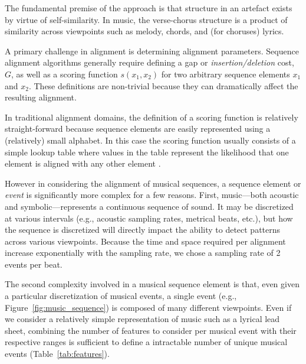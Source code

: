 \documentclass[phd,electronic,oneside,twosidetoc,letterpaper,chaptercenter,parttop,lol,lof,lot]{byumsphd}
\begin{document}
The fundamental premise of the approach is that structure in an artefact exists by virtue of self-similarity. In music, the verse-chorus structure is a product of similarity across viewpoints such as melody, chords, and (for choruses) lyrics.

A primary challenge in alignment is determining alignment parameters. Sequence alignment algorithms generally require defining a gap or \textit{insertion/deletion} cost, $G$, as well as a scoring function $s(x_1,x_2)$ for two arbitrary sequence elements $x_1$ and $x_2$. These definitions are non-trivial because they can dramatically affect the resulting alignment.

In traditional alignment domains, the definition of a scoring function is relatively straight-forward because sequence elements are easily represented using a (relatively) small alphabet. In this case the scoring function usually consists of a simple lookup table where values in the table represent the likelihood that one element is aligned with any other element \cite{henikoff1992amino}.

However in considering the alignment of musical sequences, a sequence element or \textit{event} is significantly more complex for a few reasons. First, music---both acoustic and symbolic---represents a continuous sequence of sound. It may be discretized at various intervals (e.g., acoustic sampling rates, metrical beats, etc.), but how the sequence is discretized will directly impact the ability to detect patterns across various viewpoints. Because the time and space required per alignment increase exponentially with the sampling rate, we chose a sampling rate of 2 events per beat.

The second complexity involved in a musical sequence element is that, even given a particular discretization of musical events, a single event (e.g., Figure~\ref{fig:music_sequence}) is composed of many different viewpoints. Even if we consider a relatively simple representation of music such as a lyrical lead sheet, combining the number of features to consider per musical event with their respective ranges is sufficient to define a intractable number of unique musical events (Table~\ref{tab:features}).
\end{document}
